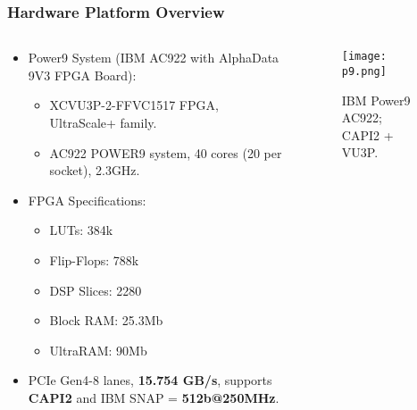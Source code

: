 \begin{frame}
    \frametitle{Hardware Platform Overview}

    \begin{columns}
        \begin{column}{0.5\textwidth}
            \begin{itemize}
                \item Power9 System (IBM AC922 with AlphaData 9V3 FPGA Board):
                \begin{itemize}
                    \item XCVU3P-2-FFVC1517 FPGA, UltraScale+ family.
                    \item AC922 POWER9 system, 40 cores (20 per socket), 2.3GHz.
                \end{itemize}
                \item FPGA Specifications:
                \begin{itemize}
                    \item LUTs: 384k
                    \item Flip-Flops: 788k
                    \item DSP Slices: 2280
                    \item Block RAM: 25.3Mb
                    \item UltraRAM: 90Mb
                \end{itemize}
	\item PCIe Gen4-8 lanes, \textbf{15.754 GB/s}, supports \textbf{CAPI2} and IBM SNAP = \textbf{512b@250MHz}.
            \end{itemize}
        \end{column}

        \begin{column}{0.5\textwidth}
	    \begin{figure}[H]
            \centering
            \texttt{[image: p9.png]}
            \caption{IBM Power9 AC922; CAPI2 + VU3P.}
	    \end{figure}
        \end{column}
    \end{columns}

\end{frame}

